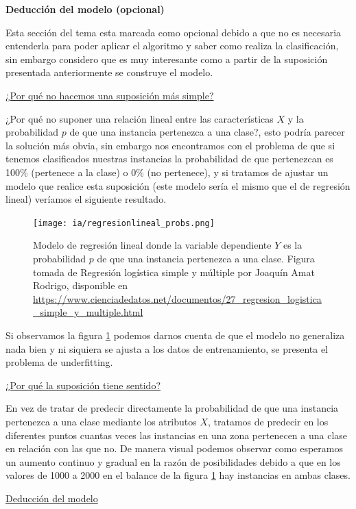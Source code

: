 \documentclass[11pt,fleqn]{book} %
\begin{document}
\textbf{Deducción del modelo (opcional)}

Esta sección del tema esta marcada como opcional debido a que no es necesaria entenderla para poder aplicar el algoritmo y saber como realiza la clasificación, sin embargo considero que es muy interesante como a partir de la suposición presentada anteriormente se construye el modelo.

\underline{¿Por qué no hacemos una suposición más simple?}

¿Por qué no suponer una relación lineal entre las características $X$ y la probabilidad $p$ de que una instancia pertenezca a una clase?, esto podría parecer la solución más obvia, sin embargo nos encontramos con el problema de que si tenemos clasificados nuestras instancias la probabilidad de que pertenezcan es 100\% (pertenece a la clase) o 0\% (no pertenece), y si tratamos de ajustar un modelo que realice esta suposición (este modelo sería el mismo que el de regresión lineal) veríamos el siguiente resultado.

\begin{figure}[ht]
\centering\texttt{[image: ia/regresionlineal\_probs.png]}
\caption{Modelo de regresión lineal donde la variable dependiente $Y$ es la probabilidad $p$ de que una instancia pertenezca a una clase. Figura tomada de  Regresión logística simple y múltiple por Joaquín Amat Rodrigo, disponible en \url{https://www.cienciadedatos.net/documentos/27_regresion_logistica_simple_y_multiple.html}}

\label{fig:regresionlineal_probs} 
\end{figure}

Si observamos la figura \ref{fig:regresionlineal_probs} podemos darnos cuenta de que el modelo no generaliza nada bien y ni siquiera se ajusta a los datos de entrenamiento, se presenta el problema de underfitting.

\underline{¿Por qué la suposición tiene sentido?}

En vez de tratar de predecir directamente la probabilidad de que una instancia pertenezca a una clase mediante los atributos $X$, tratamos de predecir en los diferentes puntos cuantas veces las instancias en una zona pertenecen a una clase en relación con las que no. De manera visual podemos observar como esperamos un aumento continuo y gradual en la razón de posibilidades debido a que en los valores de 1000 a 2000 en el balance de la figura \ref{fig:regresionlineal_probs} hay instancias en ambas clases.

\underline{Deducción del modelo}
\end{document}
